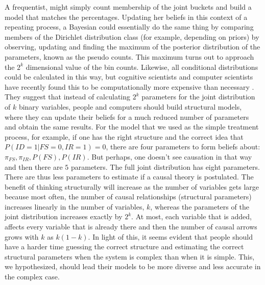 A frequentist, might simply count membership of the joint buckets and build a model that matches the percentages. Updating her beliefs in this context of a repeating process, a Bayesian could essentially do the same thing by comparing members of the Dirichlet distribution class (for example, depending on priors) by observing, updating and finding the maximum of the posterior distribution of the parameters, known as the pseudo counts. This maximum turns out to approach the $2^k$ dimensional value of the bin counts. Likewise, all conditional distributions could be calculated in this way, but cognitive scientists and computer scientists have recently found this to be computationally more expensive than necessary \citep{Griffith08, Koller03}.  They suggest that instead of calculating $2^k$ parameters for the joint distribution of $k$ binary variables, people and computers should build structural models, where they can update their beliefs for a much reduced number of parameters and obtain the same results. For the model that we used as the simple treatment process, for example, if one has the right structure and the correct idea that $P(ID=1|FS=0, IR=1)=0$, there are four parameters to form beliefs about: $\pi_{FS}, \pi_{IR}, P(FS), P(IR)$. But perhaps, one doesn't see causation in that way and then there are $5$ parameters.  The full joint distribution has eight parameters.  There are thus less parameters to estimate if a causal theory is postulated. The benefit of thinking structurally will increase as the number of variables gets large because most often, the number of causal relationships (structural parameters) increases linearly in the number of variables, $k$, whereas the parameters of the joint distribution increases exactly by $2^k$.  At most, each variable that is added, affects every variable that is already there and then the number of causal arrows grows with $k$ as $k(1-k)$. In light of this, it seems evident that people should have a harder time guessing the correct structure and estimating the correct structural parameters when the system is complex than when it is simple. This, we hypothesized, should lead their models to be more diverse and less accurate in the complex case. 

